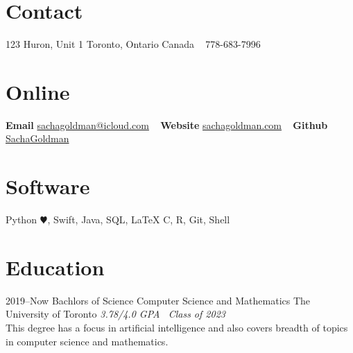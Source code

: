 \documentclass[]{style}
\begin{document}


\begin{aside} %
\section{Contact}
123 Huron, Unit 1
Toronto, Ontario
Canada 
~ \vspace{-2mm}
778-683-7996
\section{Online}
\textbf{Email}
\href{mailto:sachagoldman@icloud.com}{sachagoldman@icloud.com} 
~ \vspace{-2mm}
\textbf{Website} 
\href{https://sachagoldman.com}{sachagoldman.com} 
~ \vspace{-2mm}
\textbf{Github}
\href{https://github.com/SachaGoldman}{SachaGoldman}
\section{Software}
Python {\color{red} $\varheartsuit$}, Swift,
Java, SQL, \LaTeX
C, R, Git, Shell
\end{aside}


\section{Education}

\begin{entrylist}


\entry
{2019–Now}
{Bachlors of Science {\normalfont Computer Science and Mathematics}}
{The University of Toronto}
{\emph{3.78/4.0 GPA \ Class of 2023} \\ This degree has a focus in artificial intelligence and also covers breadth of topics in computer science and mathematics.}


\end{entrylist}
\end{document}
